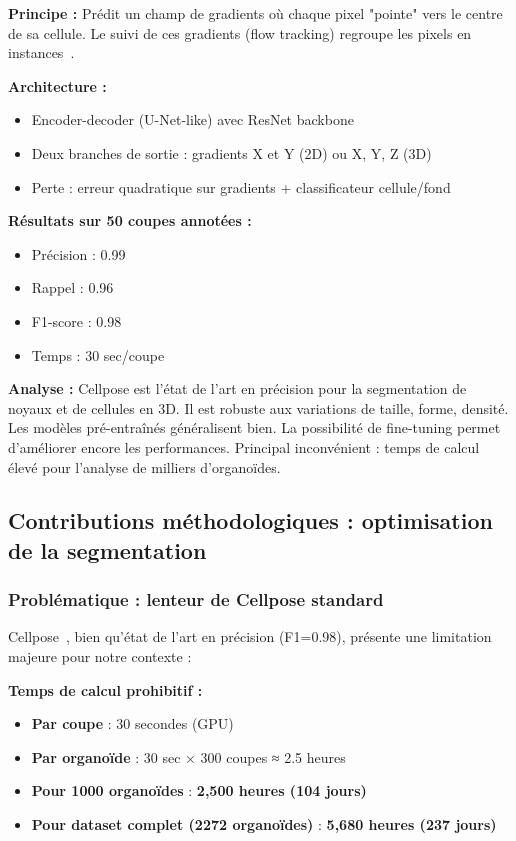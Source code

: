 \textbf{Principe :}
Prédit un champ de gradients où chaque pixel "pointe" vers le centre de sa cellule. Le suivi de ces gradients (flow tracking) regroupe les pixels en instances~\cite{Stringer2021}.

\textbf{Architecture :}
\begin{itemize}
    \item Encoder-decoder (U-Net-like) avec ResNet backbone
    \item Deux branches de sortie : gradients X et Y (2D) ou X, Y, Z (3D)
    \item Perte : erreur quadratique sur gradients + classificateur cellule/fond
\end{itemize}

\textbf{Résultats sur 50 coupes annotées :}
\begin{itemize}
    \item Précision : 0.99
    \item Rappel : 0.96
    \item F1-score : 0.98
    \item Temps : 30 sec/coupe
\end{itemize}

\textbf{Analyse :}
Cellpose est l'état de l'art en précision pour la segmentation de noyaux et de cellules en 3D. Il est robuste aux variations de taille, forme, densité. Les modèles pré-entraînés généralisent bien. La possibilité de fine-tuning permet d'améliorer encore les performances. Principal inconvénient : temps de calcul élevé pour l'analyse de milliers d'organoïdes.

\subsection{Contributions méthodologiques : optimisation de la segmentation}

\subsubsection{Problématique : lenteur de Cellpose standard}

Cellpose~\cite{Stringer2021}, bien qu'état de l'art en précision (F1=0.98), présente une limitation majeure pour notre contexte :

\textbf{Temps de calcul prohibitif :}
\begin{itemize}
    \item \textbf{Par coupe} : 30 secondes (GPU)
    \item \textbf{Par organoïde} : 30 sec × 300 coupes ≈ 2.5 heures
    \item \textbf{Pour 1000 organoïdes} : \textbf{2,500 heures (104 jours)}
    \item \textbf{Pour dataset complet (2272 organoïdes)} : \textbf{5,680 heures (237 jours)}
\end{itemize}

